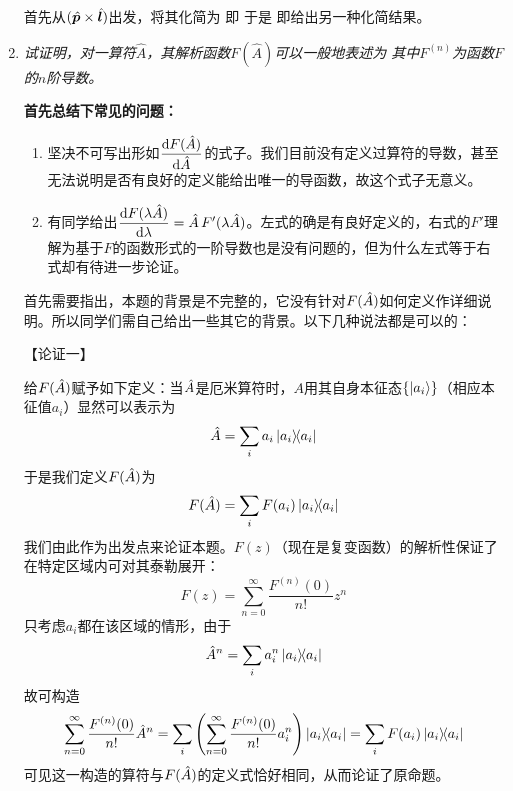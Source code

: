 \begin{enumerate}[label=2.\Alph*, leftmargin=-0.5mm]
首先从$(\hat{\boldsymbol{p}}\times\hat{\boldsymbol{l}})$出发，将其化简为
即
{\color{red}}
于是
即给出另一种化简结果。

\item
\emph{试证明，对一算符$\hat{A}$，其解析函数$F(\hat{A})$可以一般地表述为
其中$F^{(n)}$为函数$F$的$n$阶导数。}

{\color{red}\textbf{首先总结下常见的问题：}}
\begin{enumerate}
    \item 坚决不可写出形如$\dfrac{\dd{F(\hat{A})}}{\dd{\hat{A}}}$的式子。我们目前没有定义过算符的导数，甚至无法说明是否有良好的定义能给出唯一的导函数，故这个式子无意义。
    \item 有同学给出$\dfrac{\dd{F(\lambda \hat{A})}}{\dd{\lambda}} = \hat{A}\,F'(\lambda\hat{A})$。左式的确是有良好定义的，右式的$F'$理解为基于$F$的函数形式的一阶导数也是没有问题的，但为什么左式等于右式却有待进一步论证。
    
\end{enumerate}

首先需要指出，本题的背景是不完整的，它没有针对$F(\hat{A})$如何定义作详细说明。所以同学们需自己给出一些其它的背景。以下几种说法都是可以的：

【论证一】

给$F(\hat{A})$赋予如下定义：当$\hat{A}$是厄米算符时，$A$用其自身本征态$\{\ket{a_i}\}$（相应本征值$a_i$）显然可以表示为
\[\hat{A} = \sum_i a_i\ketbra{a_i}\]
于是我们定义$F(\hat{A})$为
\[F(\hat{A}) = \sum_i F(a_i)\ketbra{a_i}\]
我们由此作为出发点来论证本题。$F(z)$（现在是复变函数）的解析性保证了在特定区域内可对其泰勒展开：
\[F(z) = \sum_{n=0}^{\infty}\frac{F^{(n)}(0)}{n!}z^n\]
只考虑${a_i}$都在该区域的情形，由于
\[\hat{A}^n = \sum_i a_i^n\ketbra{a_i}\]
故可构造
\[\sum_{n=0}^{\infty}\frac{F^{(n)}(0)}{n!}\hat{A}^n = \sum_i \qty(\sum_{n=0}^{\infty}\frac{F^{(n)}(0)}{n!}a_i^n)\ketbra{a_i} = \sum_i F(a_i) \ketbra{a_i}\]
可见这一构造的算符与$F(\hat{A})$的定义式恰好相同，从而论证了原命题。


\end{enumerate}
